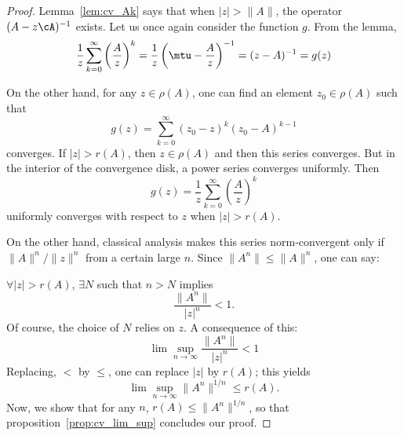 \begin{proof}
	Lemma~\ref{lem:cv_Ak} says that when $|z|>\|A\|$, the operator $(A-z\cA)^{-1}$ exists. Let us once again consider the function $g$. From the lemma,
	\begin{equation}
	\frac{1}{z}\sum_{k=0}^{\infty}\left(\frac{A}{z}\right)^k=\frac{1}{z}\left(\mtu-\frac{A}{z}\right)^{-1}
						  =(z-A)^{-1}\\
						  =g(z)
	\end{equation}

	On the other hand, for any $z\in\rho(A)$, one can find an element $z_0\in\rho(A)$ such that
	\[
	   g(z)=\sum_{k=0}^{\infty}(z_0-z)^k(z_0-A)^{k-1}
	\]
	converges. If $|z|>r(A)$, then $z\in\rho(A)$ and then this series converges. But in the interior of the convergence disk, a power series converges uniformly. Then
	\[
	  g(z)=\frac{1}{z}\sum_{k=0}^{\infty}\left(\frac{A}{z}\right)^k
	\]
	uniformly converges with respect to $z$ when $|z|>r(A)$.

	On the other hand, classical analysis makes this series norm-convergent only if $\|A\|^n/\|z\|^n$ from a certain large $n$. Since $\|A^n\|\leq\|A\|^n$, one can say:

	$\forall |z|>r(A)$, $\exists N$  such that $n>N$ implies
	\[
	   \frac{\|A^n\|}{|z|^n}<1.
	\]
	Of course, the choice of $N$ relies on $z$. A consequence of this:
	\[
	   \lim\sup_{n\to\infty}\frac{\|A^n\|}{|z|^n}<1
	\]
	Replacing, $<$ by $\leq$, one can replace $|z|$ by $r(A)$; this yields
	\begin{equation}
	   \lim\sup_{n\to\infty} \|A^n\|^{1/n}\leq r(A).
	\end{equation}
	Now, we show that for any $n$, $r(A)\leq\|A^n\|^{1/n}$, so that proposition~\ref{prop:cv_lim_sup} concludes our proof.


\end{proof}
